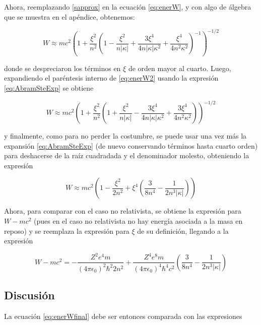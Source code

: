 \documentclass[a4paper, 12pt]{article} %
\begin{document}
Ahora, reemplazando \ref{sapprox} en la ecuaci\'on \ref{eq:enerW}, y con algo de \'algebra que se muestra en el ap\'endice, obtenemos:

\begin{equation}\label{eq:enerW2}
W \approx mc^2 \left( 1+ \frac{\xi^2}{n^2} \left( 1-\frac{\xi^2}{n|\kappa|} + \frac{3\xi^4}{4n|\kappa|\kappa^2} + \frac{\xi^4}{4n^2\kappa^2} \right)^{-1}  \right)^{-1/2}
\end{equation}

donde se despreciaron los t\'erminos en $\xi$ de orden mayor al cuarto. Luego, expandiendo el par\'entesis interno de \ref{eq:enerW2} usando la expresi\'on \ref{eq:AbramSteExp} se obtiene 


\begin{equation}\label{eq:enerW3}
W \approx mc^2 \left( 1+ \frac{\xi^2}{n^2} \left( 1 + \frac{\xi^2}{n|\kappa|} - \frac{3\xi^4}{4n|\kappa|\kappa^2} + \frac{3\xi^4}{4n^2\kappa^2} \right)  \right)^{-1/2}
\end{equation}

y finalmente, como para no perder la costumbre, se puede usar una vez m\'as la expansi\'on \ref{eq:AbramSteExp} (de nuevo conservando t\'erminos hasta cuarto orden) para deshacerse de la ra\'iz cuadradada y el denominador molesto, obteniendo la expresi\'on

\begin{equation}\label{eq:enerW4}
W\approx mc^2 \left(  1- \frac{\xi^2}{2n^2} +\xi^4 \left( \frac{3}{8n^4}-\frac{1}{2n^3 |\kappa|} \right)  \right)
\end{equation}

Ahora, para comparar con el caso no relativista, se obtiene la expresi\'on para $W-mc^2$ (pues en el caso no relativista no hay energ\'ia asociada a la masa en reposo) y se reemplaza la expresi\'on para $\xi$ de su definici\'on, llegando a la expresi\'on 

\begin{equation}\label{eq:enerWfinal}
W-mc^2 = -\frac{Z^2e^4m}{(4\pi\epsilon_0)^2\hbar^2 2n^2}+\frac{Z^4e^8m}{(4\pi\epsilon_0)^4\hbar^4 c^2} \left( \frac{ 3}{8n^4}-\frac{1}{2n^3|\kappa|} \right)
\end{equation}


\subsection{Discusi\'on}

La ecuaci\'on \ref{eq:enerWfinal} debe ser entonces comparada con las expresiones 
\end{document}
